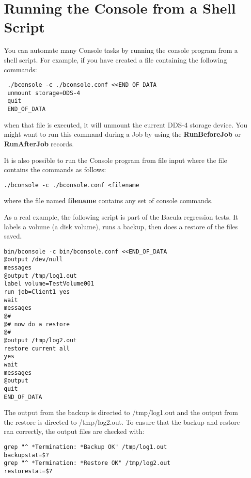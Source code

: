 \label{scripting}
\section{Running the Console from a Shell Script}

You can automate many Console tasks by running the console program from a
shell script. For example, if you have created a file containing the following
commands: 

\footnotesize
\begin{verbatim}
 ./bconsole -c ./bconsole.conf <<END_OF_DATA
 unmount storage=DDS-4
 quit
 END_OF_DATA
\end{verbatim}
\normalsize

when that file is executed, it will unmount the current DDS-4 storage device.
You might want to run this command during a Job by using the {\bf
RunBeforeJob} or {\bf RunAfterJob} records. 

It is also possible to run the Console program from file input where the file
contains the commands as follows: 

\footnotesize
\begin{verbatim}
./bconsole -c ./bconsole.conf <filename
\end{verbatim}
\normalsize

where the file named {\bf filename} contains any set of console commands. 

As a real example, the following script is part of the Bacula regression
tests. It labels a volume (a disk volume), runs a backup, then does a restore
of the files saved. 

\footnotesize
\begin{verbatim}
bin/bconsole -c bin/bconsole.conf <<END_OF_DATA
@output /dev/null
messages
@output /tmp/log1.out
label volume=TestVolume001
run job=Client1 yes
wait
messages
@#
@# now do a restore
@#
@output /tmp/log2.out
restore current all
yes
wait
messages
@output
quit
END_OF_DATA
\end{verbatim}
\normalsize

The output from the backup is directed to /tmp/log1.out and the output from
the restore is directed to /tmp/log2.out. To ensure that the backup and
restore ran correctly, the output files are checked with: 

\footnotesize
\begin{verbatim}
grep "^ *Termination: *Backup OK" /tmp/log1.out
backupstat=$?
grep "^ *Termination: *Restore OK" /tmp/log2.out
restorestat=$?
\end{verbatim}
\normalsize


